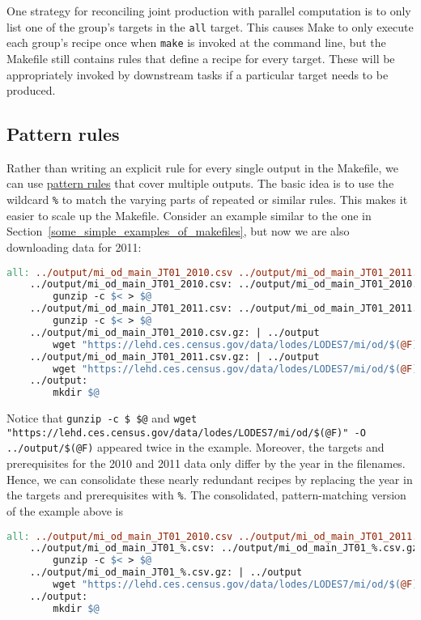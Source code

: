 One strategy for reconciling joint production with parallel computation is to only list one of the group's targets in the \texttt{all} target.
This causes Make to only execute each group's recipe once when \texttt{make} is invoked at the command line,
but the Makefile still contains rules that define a recipe for every target.
These will be appropriately invoked by downstream tasks if a particular target needs to be produced.

\subsection{Pattern rules}
Rather than writing an explicit rule for every single output in the Makefile,
we can use 
\href{https://www.gnu.org/software/make/manual/html_node/Pattern-Rules.html}{pattern rules}
that cover multiple outputs.
The basic idea is to use the wildcard \texttt{\%} to match the varying parts of repeated or similar rules.
This makes it easier to scale up the Makefile.
Consider an example similar to the one in Section~\ref{some_simple_examples_of_makefiles},
	but now we are also downloading data for 2011:
\begin{lstlisting}[language=make]
	all: ../output/mi_od_main_JT01_2010.csv ../output/mi_od_main_JT01_2011.csv
	../output/mi_od_main_JT01_2010.csv: ../output/mi_od_main_JT01_2010.csv.gz
		gunzip -c $< > $@
	../output/mi_od_main_JT01_2011.csv: ../output/mi_od_main_JT01_2011.csv.gz
		gunzip -c $< > $@
	../output/mi_od_main_JT01_2010.csv.gz: | ../output
		wget "https://lehd.ces.census.gov/data/lodes/LODES7/mi/od/$(@F)" -O ../output/$(@F)
	../output/mi_od_main_JT01_2011.csv.gz: | ../output
		wget "https://lehd.ces.census.gov/data/lodes/LODES7/mi/od/$(@F)" -O ../output/$(@F)
	../output:
		mkdir $@
\end{lstlisting}
Notice that \texttt{gunzip -c \$< > \$@}
	and \texttt{wget "https://lehd.ces.census.gov/data/lodes/LODES7/mi/od/\$(@F)" -O ../output/\$(@F)}
	appeared twice in the example.
Moreover, the targets and prerequisites for the 2010 and 2011 data
	only differ by the year in the filenames.
Hence, we can consolidate these nearly redundant recipes by replacing the year
	in the targets and prerequisites with \texttt{\%}.
The consolidated, pattern-matching version of the example above is
\begin{lstlisting}[language=make]
	all: ../output/mi_od_main_JT01_2010.csv ../output/mi_od_main_JT01_2011.csv
	../output/mi_od_main_JT01_%.csv: ../output/mi_od_main_JT01_%.csv.gz
		gunzip -c $< > $@
	../output/mi_od_main_JT01_%.csv.gz: | ../output
		wget "https://lehd.ces.census.gov/data/lodes/LODES7/mi/od/$(@F)" -O ../output/$(@F)
	../output:
		mkdir $@
\end{lstlisting}
